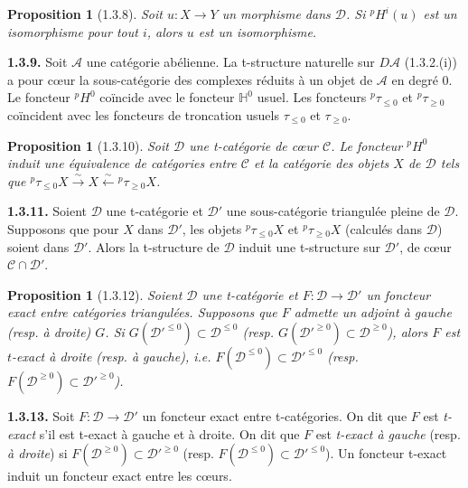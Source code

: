 \documentclass[12pt,a4paper]{article}
\theoremstyle{plain}
\newtheorem{proposition}[theorem]{Proposition}
\theoremstyle{definition}
\theoremstyle{remark}
\newcommand{\HH}{\mathbb{H}}
\newcommand{\cA}{\mathcal{A}}
\newcommand{\cC}{\mathcal{C}}
\newcommand{\cD}{\mathcal{D}}
\begin{document}
\smallskip

\begin{proposition}[1.3.8]
Soit $u : X \to Y$ un morphisme dans $\cD$. Si ${}^{p}H^{i}(u)$ est un isomorphisme pour tout $i$, alors $u$ est un isomorphisme.
\end{proposition}

\smallskip

\noindent
\textbf{1.3.9.} Soit $\cA$ une catégorie abélienne. La t-structure naturelle sur $D\cA$ (1.3.2.(i)) a pour cœur la sous-catégorie des complexes réduits à un objet de $\cA$ en degré $0$. Le foncteur ${}^{p}H^{0}$ coïncide avec le foncteur $\HH^{0}$ usuel. Les foncteurs ${}^{p}\tau_{\leq 0}$ et ${}^{p}\tau_{\geq 0}$ coïncident avec les foncteurs de troncation usuels $\tau_{\leq 0}$ et $\tau_{\geq 0}$.

\smallskip

\begin{proposition}[1.3.10]
Soit $\cD$ une t-catégorie de cœur $\cC$. Le foncteur ${}^{p}H^{0}$ induit une équivalence de catégories entre $\cC$ et la catégorie des objets $X$ de $\cD$ tels que ${}^{p}\tau_{\leq 0}X \xrightarrow{\sim} X \xleftarrow{\sim} {}^{p}\tau_{\geq 0}X$.
\end{proposition}

\smallskip

\noindent
\textbf{1.3.11.} Soient $\cD$ une t-catégorie et $\cD'$ une sous-catégorie triangulée pleine de $\cD$. Supposons que pour $X$ dans $\cD'$, les objets ${}^{p}\tau_{\leq 0}X$ et ${}^{p}\tau_{\geq 0}X$ (calculés dans $\cD$) soient dans $\cD'$. Alors la t-structure de $\cD$ induit une t-structure sur $\cD'$, de cœur $\cC \cap \cD'$.

\smallskip

\begin{proposition}[1.3.12]
Soient $\cD$ une t-catégorie et $F : \cD \to \cD'$ un foncteur exact entre catégories triangulées. Supposons que $F$ admette un adjoint à gauche (resp. à droite) $G$. Si $G(\cD'^{\leq 0}) \subset \cD^{\leq 0}$ (resp. $G(\cD'^{\geq 0}) \subset \cD^{\geq 0}$), alors $F$ est $t$-exact à droite (resp. à gauche), i.e. $F(\cD^{\leq 0}) \subset \cD'^{\leq 0}$ (resp. $F(\cD^{\geq 0}) \subset \cD'^{\geq 0}$).
\end{proposition}

\smallskip

\noindent
\textbf{1.3.13.} Soit $F : \cD \to \cD'$ un foncteur exact entre t-catégories. On dit que $F$ est \emph{t-exact} s'il est t-exact à gauche et à droite. On dit que $F$ est \emph{t-exact à gauche} (resp. \emph{à droite}) si $F(\cD^{\geq 0}) \subset \cD'^{\geq 0}$ (resp. $F(\cD^{\leq 0}) \subset \cD'^{\leq 0}$). Un foncteur t-exact induit un foncteur exact entre les cœurs.
\end{document}
